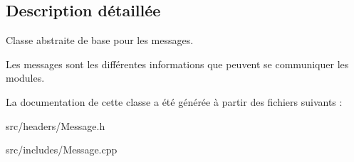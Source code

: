 \subsection{Description détaillée}
Classe abstraite de base pour les messages. 

Les messages sont les différentes informations que peuvent se communiquer les modules. 

La documentation de cette classe a été générée à partir des fichiers suivants \-:\begin{DoxyCompactItemize}
\item 
src/headers/Message.\-h\item 
src/includes/Message.\-cpp\end{DoxyCompactItemize}
